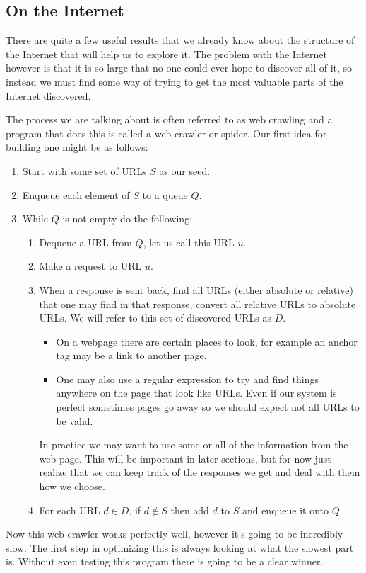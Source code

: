 \documentclass{article}
\begin{document}
	\subsection{On the Internet}
	There are quite a few useful results that we already know about the structure of the Internet that will help us to explore it. The problem with the Internet however is that it is so large that no one could ever hope to discover all of it, so instead we must find some way of trying to get the most valuable parts of the Internet discovered.
	
	The process we are talking about is often referred to as web crawling and a program that does this is called a web crawler or spider. Our first idea for building one might be as follows:
	\begin{enumerate}
		\item Start with some set of URLs $S$ as our seed. 
		\item Enqueue each element of $S$ to a queue $Q$.
		\item While $Q$ is not empty do the following:
		\begin{enumerate}
			\item Dequeue a URL from $Q$, let us call this URL $u$.
			\item Make a request to URL $u$.
			\item When a response is sent back, find all URLs (either absolute or relative) that one may find in that response, convert all relative URLs to absolute URLs. We will refer to this set of discovered URLs as $D$.
			\begin{itemize}
				\item On a webpage there are certain places to look, for example an anchor tag may be a link to another page.
				\item One may also use a regular expression to try and find things anywhere on the page that look like URLs. Even if our system is perfect sometimes pages go away so we should expect not all URLs to be valid.
			\end{itemize}
			In practice we may want to use some or all of the information from the web page. This will be important in later sections, but for now just realize that we can keep track of the responses we get and deal with them how we choose.
			\item For each URL $d\in D$, if $d \not\in S$ then add $d$ to $S$ and enqueue it onto $Q$.
		\end{enumerate}
	\end{enumerate}
	
	Now this web crawler works perfectly well, however it's going to be incredibly slow. The first step in optimizing this is always looking at what the slowest part is. Without even testing this program there is going to be a clear winner.
	
	
\end{document}
